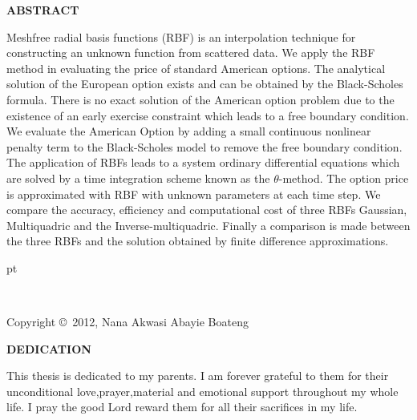 \documentclass[12pt]{article}
\numberwithin{equation}{subsection} %
\begin{document}

\newpage
\begin{center}
{\bf ABSTRACT}\\
\end{center}
\baselineskip=24pt


Meshfree radial basis functions (RBF) is an interpolation technique
for constructing an unknown function from scattered data. We apply
the  RBF method in evaluating the price of standard  American
options. The analytical solution of the European option exists and
can be obtained by the Black-Scholes formula. There is no exact
solution of the American option problem due to the existence of an
early exercise constraint which leads to a free boundary condition.
We evaluate the American Option by adding a small continuous
nonlinear penalty term to the Black-Scholes model to remove the free
boundary condition. The application of RBFs leads to a system
ordinary differential equations which are solved by a time
integration scheme known as the $\theta$-method. The option price is
approximated with RBF with unknown parameters at each time step. We
compare the accuracy, efficiency and computational cost of three
RBFs Gaussian, Multiquadric and the Inverse-multiquadric. Finally a
comparison is made between the three RBFs and the solution obtained
by finite difference approximations.


\newpage
{} pt
\begin{center}
\ \ \
\vspace{3.in}

Copyright \copyright\ 2012, Nana Akwasi Abayie Boateng
\end{center}


\newpage

\begin{center}

{ \bf DEDICATION } \\ [.15in]
\end{center}

This thesis is dedicated to my parents. I am forever grateful to
them for their unconditional love,prayer,material and emotional
support throughout   my whole life. I pray the good Lord reward them
for all their sacrifices in my life.
\end{document}
